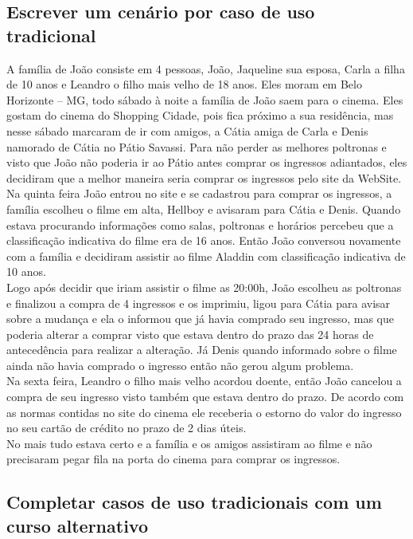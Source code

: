 \documentclass[12pt]{article}
\begin{document}
        \subsection{Escrever um cenário por caso de uso tradicional}
            A família de João consiste em 4 pessoas, João, Jaqueline sua esposa, Carla a filha de 10 anos e Leandro o filho mais velho de 18 anos. Eles moram em Belo Horizonte – MG, todo sábado à noite a família de João saem para o cinema. 
            Eles gostam do cinema do Shopping Cidade, pois fica próximo a sua residência, mas nesse sábado marcaram de ir com amigos, a Cátia amiga de Carla e Denis namorado de Cátia no Pátio Savassi. Para não perder as melhores poltronas e visto que João não poderia ir ao Pátio antes comprar os ingressos adiantados, eles decidiram que a melhor maneira seria comprar os ingressos pelo site da WebSite.\\
            Na quinta feira João entrou no site e se cadastrou para comprar os ingressos, a família escolheu o filme em alta, Hellboy e avisaram para Cátia e Denis. Quando estava procurando informações como salas, poltronas e horários percebeu que a classificação indicativa do filme era de 16 anos. Então João conversou novamente com a família e decidiram assistir ao filme Aladdin com classificação indicativa de 10 anos. \\
            Logo após decidir que iriam assistir o filme as 20:00h, João escolheu as poltronas e finalizou a compra de 4 ingressos e os imprimiu, ligou para Cátia para avisar sobre a mudança e ela o informou que já havia comprado seu ingresso, mas que poderia alterar a comprar visto que estava dentro do prazo das 24 horas de antecedência para realizar a alteração. Já Denis quando informado sobre o filme ainda não havia comprado o ingresso então não gerou algum problema.\\
            Na sexta feira, Leandro o filho mais velho acordou doente, então João cancelou a compra de seu ingresso visto também que estava dentro do prazo. De acordo com as normas contidas no site do cinema ele receberia o estorno do valor do ingresso no seu cartão de crédito no prazo de 2 dias úteis.\\
            No mais tudo estava certo e a família e os amigos assistiram ao filme e não precisaram pegar fila na porta do cinema para comprar os ingressos.

        \subsection{Completar casos de uso tradicionais com um curso alternativo}
        
\end{document}
